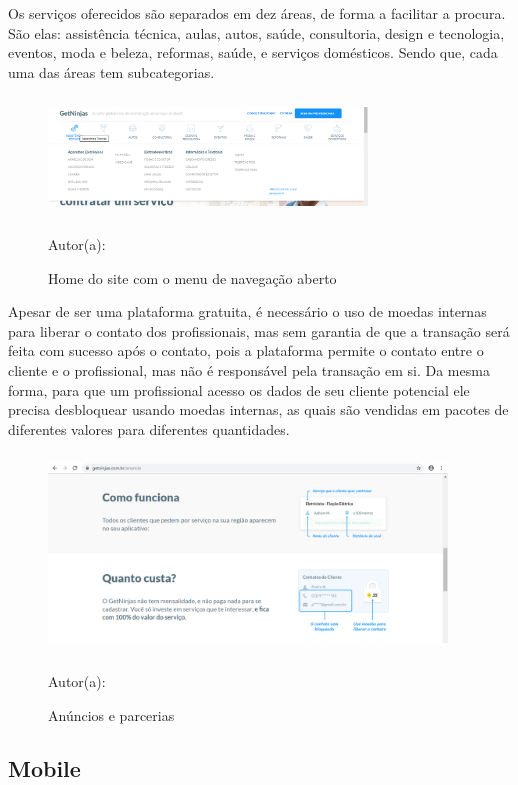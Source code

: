 Os serviços oferecidos são separados em dez áreas, de forma a facilitar a procura. São elas: assistência técnica, aulas, autos, saúde, consultoria, design e tecnologia, eventos, moda e beleza, reformas, saúde, e serviços domésticos. Sendo que, cada uma das áreas tem subcategorias.

\begin{figure}[!h]
	\centering
	\caption{Home do site com o menu de navegação aberto}
	\includegraphics[width=320px, height=120px]{./images/getninjas2.png}
	\par {Autor(a): \cite{get-ninjas}}
\end{figure}


Apesar de ser uma plataforma gratuita, é necessário o uso de moedas internas para liberar o contato dos profissionais, mas sem garantia de que a transação será feita com sucesso após o contato, pois a plataforma permite o contato entre o cliente e o profissional, mas não é responsável pela transação em si. Da mesma forma, para que um profissional acesso os dados de seu cliente potencial ele precisa desbloquear usando moedas internas, as quais são vendidas em pacotes de diferentes valores para diferentes quantidades.


\begin{figure}[!h]
	\centering
	\caption{Anúncios e parcerias }
	\includegraphics[width=400px, height=200px]{./images/getninjas3.png}
	\par {Autor(a): \cite{get-ninjas-a}}
\end{figure}


\subsection{Mobile}


